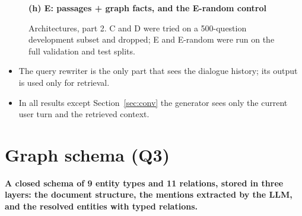 \documentclass[11pt,a4paper]{article}
\newcommand{\gen}{\texttt{gpt-5.4-nano}}
\begin{document}
\begin{figure}[H]
\vspace{2mm}\textbf{(h) E: passages + graph facts, and the E-random control}\\[2pt]
\caption{Architectures, part 2. C and D were tried on a 500-question development subset and
dropped; E and E-random were run on the full validation and test splits.}
\label{fig:arch2}
\end{figure}

\begin{itemize}
\item The query rewriter is the only part that sees the dialogue history; its output is used only
  for retrieval.
\item In all results except Section~\ref{sec:conv} the generator sees only the current user turn
  and the retrieved context.
\end{itemize}

\section{Graph schema (Q3)}\label{sec:schema}

\textbf{A closed schema of 9 entity types and 11 relations, stored in three layers: the document
structure, the mentions extracted by the LLM, and the resolved entities with typed relations.}
\end{document}
